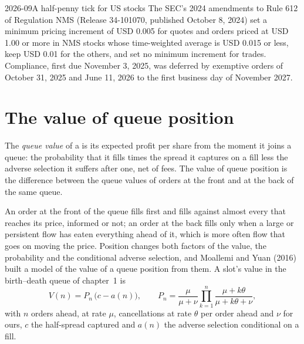\begin{dated}{2026-09}{A half-penny tick for US stocks}\label{dat:mx:tick-size-queues-and-priority:rule612}
The SEC's 2024 amendments to Rule 612 of Regulation NMS (Release 34-101070, published October 8, 2024) set a minimum pricing increment of USD 0.005
for quotes and orders priced at USD 1.00 or more in NMS stocks whose time-weighted average  is USD 0.015 or less, keep USD 0.01 for the
others, and set no minimum increment for trades. Compliance, first due November 3, 2025, was deferred by exemptive orders of October 31, 2025 and June 11, 2026 to
the first business day of November 2027.
\end{dated}

\section{The value of queue position}

\begin{definition}\label{def:mx:tick-size-queues-and-priority:queuevalue}
The \emph{queue value} of a  is its expected profit per share from the moment it joins a queue: the probability that it
fills times the spread it captures on a fill less the adverse selection it suffers after one, net of fees. The value of queue position is the difference
between the queue values of orders at the front and at the back of the same queue.
\end{definition}

An order at the front of the queue fills first and fills against almost every  that reaches its price, informed or not; an order at the back
fills only when a large or persistent flow has eaten everything ahead of it, which is more often flow that goes on moving the price. Position changes both
factors of the value, the probability and the conditional adverse selection, and Moallemi and Yuan (2016) built a model of the value of a queue position
from them. A slot's value in the birth--death queue of chapter~1 is
\[
V(n)=P_n\,\bigl(c-a(n)\bigr),\qquad P_n=\frac{\mu}{\mu+\nu}\prod_{k=1}^{n}\frac{\mu+k\theta}{\mu+k\theta+\nu},
\]
with $n$ orders ahead,  at rate $\mu$, cancellations at rate $\theta$ per order ahead and $\nu$ for ours, $c$ the half-spread captured
and $a(n)$ the adverse selection conditional on a fill.

